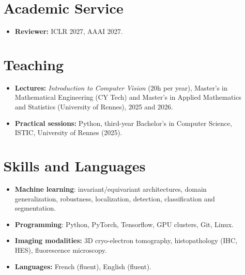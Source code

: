 \documentclass[10pt,a4paper]{article}
\begin{document}
\section{Academic Service}

\begin{itemize}[label={}, leftmargin=0pt]
  \item \textbf{Reviewer:} ICLR 2027, AAAI 2027.\end{itemize}

\section{Teaching}

\begin{itemize}[label={}, leftmargin=0pt]
  \item \textbf{Lectures:} \textit{Introduction to Computer Vision} (20h per year), Master's in Mathematical Engineering (CY Tech) and Master's in Applied Mathematics and Statistics (University of Rennes), 2025 and 2026.
  \item \textbf{Practical sessions:} Python, third-year Bachelor's in Computer Science, ISTIC, University of Rennes (2025).
\end{itemize}

\section{Skills and Languages}

\begin{itemize}
\item \textbf{Machine learning}: invariant/equivariant architectures, domain generalization, robustness, localization, detection, classification and segmentation.
\item \textbf{Programming}: Python, PyTorch, Tensorflow, GPU clusters, Git, Linux.
  \item \textbf{Imaging modalities:} 3D cryo-electron tomography, histopathology (IHC, HES), fluorescence microscopy.
  \item \textbf{Languages:} French (fluent), English (fluent).
\end{itemize}

\end{document}
